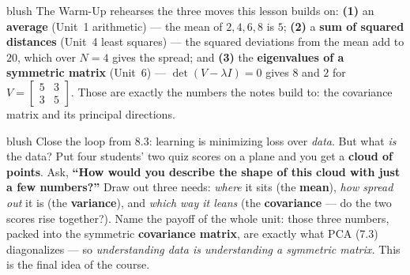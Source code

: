 \documentclass[10pt]{article}
\begin{document}
\begin{fixedskillbox}{blush}
    The Warm-Up rehearses the three moves this lesson builds on: \textbf{(1)} an \textbf{average}
    (Unit~1 arithmetic) --- the mean of $2,4,6,8$ is $5$; \textbf{(2)} a \textbf{sum of squared distances}
    (Unit~4 least squares) --- the squared deviations from the mean add to $20$, which over $N=4$ gives the
    spread; and \textbf{(3)} the \textbf{eigenvalues of a symmetric matrix} (Unit~6) --- $\det(V-\lambda I)=0$
    gives $8$ and $2$ for $V=\left[\begin{smallmatrix}5&3\\3&5\end{smallmatrix}\right]$. Those are exactly the
    numbers the notes build to: the covariance matrix and its principal directions.
\end{fixedskillbox}

\begin{skillbox}[Hook]{blush}
    Close the loop from 8.3: learning is minimizing loss over \emph{data}. But what \emph{is} the data? Put four
    students' two quiz scores on a plane and you get a \textbf{cloud of points}. Ask, \textbf{``How would you
    describe the shape of this cloud with just a few numbers?''} Draw out three needs: \emph{where} it sits (the
    \textbf{mean}), \emph{how spread out} it is (the \textbf{variance}), and \emph{which way it leans}
    (the \textbf{covariance} --- do the two scores rise together?). Name the payoff of the whole unit: those
    three numbers, packed into the symmetric \textbf{covariance matrix}, are exactly what PCA (7.3) diagonalizes
    --- so \emph{understanding data is understanding a symmetric matrix.} This is the final idea of the course.
\end{skillbox}
\end{document}
